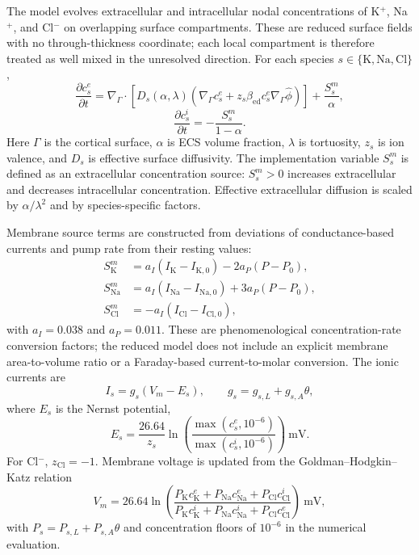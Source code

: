 \documentclass[12pt]{article}
\begin{document}
The model evolves extracellular and intracellular nodal concentrations of K$^+$, Na$^+$, and Cl$^-$ on overlapping surface compartments. These are reduced surface fields with no through-thickness coordinate; each local compartment is therefore treated as well mixed in the unresolved direction. For each species $s\in\{\mathrm{K},\mathrm{Na},\mathrm{Cl}\}$,
\begin{equation}
\frac{\partial c_s^{e}}{\partial t}
= \nabla_{\Gamma}\!\cdot\!\left[
D_s(\alpha,\lambda)
\left(
\nabla_{\Gamma}c_s^{e}
+z_s\beta_{\mathrm{ed}}c_s^{e}\nabla_{\Gamma}\hat{\phi}
\right)
\right]
+\frac{S_s^{m}}{\alpha},
\label{eq:extracellular}
\end{equation}
\begin{equation}
\frac{\partial c_s^{i}}{\partial t}
=-\frac{S_s^{m}}{1-\alpha}.
\label{eq:intracellular}
\end{equation}
Here $\Gamma$ is the cortical surface, $\alpha$ is ECS volume fraction, $\lambda$ is tortuosity, $z_s$ is ion valence, and $D_s$ is effective surface diffusivity. The implementation variable $S_s^m$ is defined as an extracellular concentration source: $S_s^m>0$ increases extracellular and decreases intracellular concentration. Effective extracellular diffusion is scaled by $\alpha/\lambda^2$ and by species-specific factors.

Membrane source terms are constructed from deviations of conductance-based currents and pump rate from their resting values:
\begin{align}
S_{\mathrm K}^{m} &= a_I(I_{\mathrm K}-I_{\mathrm K,0})-2a_P(P-P_0),\\
S_{\mathrm{Na}}^{m} &= a_I(I_{\mathrm{Na}}-I_{\mathrm{Na},0})+3a_P(P-P_0),\\
S_{\mathrm{Cl}}^{m} &= -a_I(I_{\mathrm{Cl}}-I_{\mathrm{Cl},0}),
\end{align}
with $a_I=0.038$ and $a_P=0.011$. These are phenomenological concentration-rate conversion factors; the reduced model does not include an explicit membrane area-to-volume ratio or a Faraday-based current-to-molar conversion. The ionic currents are
\begin{equation}
I_s=g_s(V_m-E_s),
\qquad
g_s=g_{s,L}+g_{s,A}\theta,
\end{equation}
where $E_s$ is the Nernst potential,
\begin{equation}
E_s=\frac{26.64}{z_s}\ln\!\left(\frac{\max(c_s^{e},10^{-6})}{\max(c_s^{i},10^{-6})}\right)\ \mathrm{mV}.
\end{equation}
For Cl$^-$, $z_{\mathrm{Cl}}=-1$. Membrane voltage is updated from the Goldman--Hodgkin--Katz relation
\begin{equation}
V_m=26.64\ln\!\left(
\frac{P_{\mathrm K}c_{\mathrm K}^{e}+P_{\mathrm{Na}}c_{\mathrm{Na}}^{e}+P_{\mathrm{Cl}}c_{\mathrm{Cl}}^{i}}
{P_{\mathrm K}c_{\mathrm K}^{i}+P_{\mathrm{Na}}c_{\mathrm{Na}}^{i}+P_{\mathrm{Cl}}c_{\mathrm{Cl}}^{e}}
\right)\ \mathrm{mV},
\end{equation}
with $P_s=P_{s,L}+P_{s,A}\theta$ and concentration floors of $10^{-6}$ in the numerical evaluation.
\end{document}
